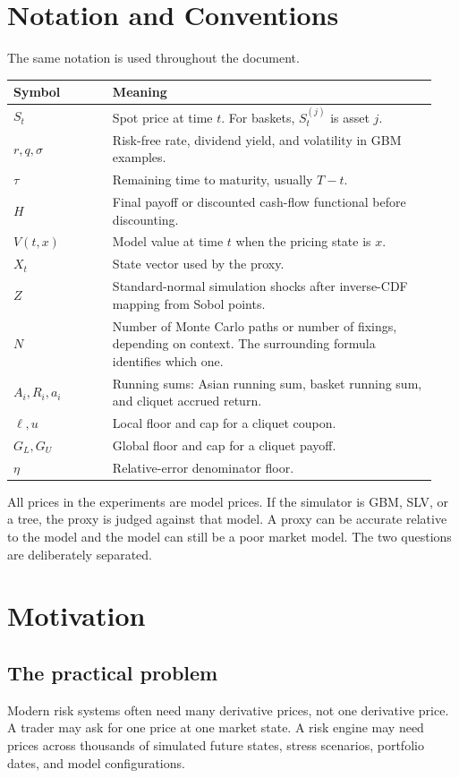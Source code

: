 \documentclass[11pt,oneside]{book}
\theoremstyle{definition}
\begin{document}
\chapter*{Notation and Conventions}
The same notation is used throughout the document.
\begin{longtable}{@{}p{0.22\linewidth}p{0.72\linewidth}@{}}
\toprule
Symbol & Meaning\\
\midrule
\(S_t\) & Spot price at time \(t\). For baskets, \(S_t^{(j)}\) is asset \(j\).\\
\(r,q,\sigma\) & Risk-free rate, dividend yield, and volatility in GBM examples.\\
\(\tau\) & Remaining time to maturity, usually \(T-t\).\\
\(H\) & Final payoff or discounted cash-flow functional before discounting.\\
\(V(t,x)\) & Model value at time \(t\) when the pricing state is \(x\).\\
\(X_t\) & State vector used by the proxy.\\
\(Z\) & Standard-normal simulation shocks after inverse-CDF mapping from Sobol points.\\
\(N\) & Number of Monte Carlo paths or number of fixings, depending on context. The surrounding formula identifies which one.\\
\(A_i,R_i,a_i\) & Running sums: Asian running sum, basket running sum, and cliquet accrued return.\\
\(\ell,u\) & Local floor and cap for a cliquet coupon.\\
\(G_L,G_U\) & Global floor and cap for a cliquet payoff.\\
\(\eta\) & Relative-error denominator floor.\\
\bottomrule
\end{longtable}

All prices in the experiments are model prices. If the simulator is GBM, SLV, or a tree, the proxy is judged against that model. A proxy can be accurate relative to the model and the model can still be a poor market model. The two questions are deliberately separated.

\mainmatter

\chapter{Motivation}

\section{The practical problem}
Modern risk systems often need many derivative prices, not one derivative price. A trader may ask for one price at one market state. A risk engine may need prices across thousands of simulated future states, stress scenarios, portfolio dates, and model configurations.
\end{document}
